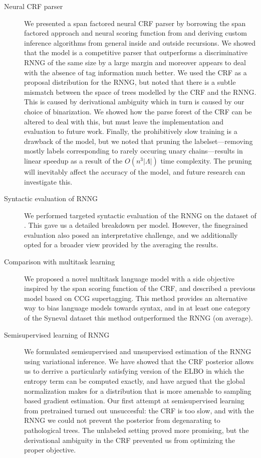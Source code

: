   \begin{description}
    \item[Neural CRF parser]
      We presented a span factored neural CRF parser by borrowing the span factored approach and neural scoring function from \cite{stern2017minimal} and deriving custom inference algorithms from general inside and outside recursions. We showed that the model is a competitive parser that outperforms a discriminative RNNG of the same size by a large margin and moreover appears to deal with the absence of tag information much better. We used the CRF as a proposal distribution for the RNNG, but noted that there is a subtle mismatch between the space of trees modelled by the CRF and the RNNG. This is caused by derivational ambiguity which in turn is caused by our choice of binarization. We showed how the parse forest of the CRF can be altered to deal with this, but must leave the implementation and evaluation to future work. Finally, the prohibitively slow training is a drawback of the model, but we noted that pruning the labelset---removing mostly labels corresponding to rarely occuring unary chains---results in linear speedup as a result of the $O(n^3 \lvert \Lambda \rvert)$ time complexity. The pruning will inevitably affect the accuracy of the model, and future research can investigate this.

    \item[Syntactic evaluation of RNNG]
      We performed targeted syntactic evaluation of the RNNG on the dataset of \citet{linzen2018targeted}. This gave us a detailed breakdown per model. However, the finegrained evaluation also posed an interpretative challenge, and we additionally opted for a broader view provided by the averaging the results.

    \item[Comparison with multitask learning]
      We proposed a novel multitask language model with a side objective inspired by the span scoring function of the CRF, and described a previous model based on CCG supertagging. This method provides an alternative way to bias language models towards syntax, and in at least one category of the Syneval dataset this method outperformed the RNNG (on average).

    \item[Semisupervised learning of RNNG]
      We formulated semisupervised and unsupervised estimation of the RNNG using variational inference. We have showed that the CRF posterior allows us to derrive a particularly satisfying version of the ELBO in which the entropy term can be computed exactly, and have argued that the global normalization makes for a distribution that is more amenable to sampling based gradient estimation. Our first attempt at semisupervised learning from pretrained turned out unsuccesful: the CRF is too slow, and with the RNNG we could not prevent the posterior from degenarating to pathological trees. The unlabeled setting proved more promising, but the derivational ambiguity in the CRF prevented us from optimizing the proper objective.

  \end{description}

